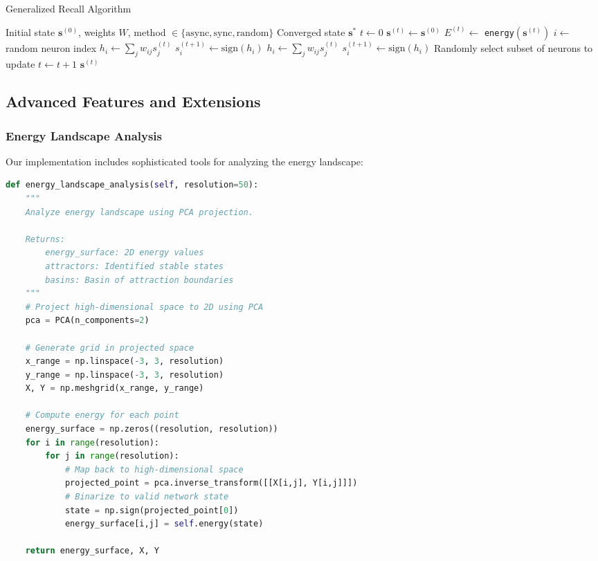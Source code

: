 \documentclass[11pt,a4paper]{article}
\begin{document}
\begin{algorithm}[H]
\caption{Generalized Recall Algorithm}
\begin{algorithmic}[1]
\REQUIRE Initial state $\mathbf{s}^{(0)}$, weights $W$, method $\in \{\text{async}, \text{sync}, \text{random}\}$
\ENSURE Converged state $\mathbf{s}^*$
\STATE $t \leftarrow 0$
\STATE $\mathbf{s}^{(t)} \leftarrow \mathbf{s}^{(0)}$
\REPEAT
    \STATE $E^{(t)} \leftarrow $ \texttt{energy}$(\mathbf{s}^{(t)})$
        \STATE $i \leftarrow $ random neuron index
        \STATE $h_i \leftarrow \sum_{j} w_{ij} s_j^{(t)}$
        \STATE $s_i^{(t+1)} \leftarrow \text{sign}(h_i)$
            \STATE $h_i \leftarrow \sum_{j} w_{ij} s_j^{(t)}$
            \STATE $s_i^{(t+1)} \leftarrow \text{sign}(h_i)$
        \ENDFOR
        \STATE Randomly select subset of neurons to update
    \ENDIF
    \STATE $t \leftarrow t + 1$
\RETURN $\mathbf{s}^{(t)}$
\end{algorithmic}
\end{algorithm}

\subsection{Advanced Features and Extensions}

\subsubsection{Energy Landscape Analysis}

Our implementation includes sophisticated tools for analyzing the energy landscape:

\begin{lstlisting}[language=Python, caption=Energy Landscape Analysis]
def energy_landscape_analysis(self, resolution=50):
    """
    Analyze energy landscape using PCA projection.
    
    Returns:
        energy_surface: 2D energy values
        attractors: Identified stable states
        basins: Basin of attraction boundaries
    """
    # Project high-dimensional space to 2D using PCA
    pca = PCA(n_components=2)
    
    # Generate grid in projected space
    x_range = np.linspace(-3, 3, resolution)
    y_range = np.linspace(-3, 3, resolution)
    X, Y = np.meshgrid(x_range, y_range)
    
    # Compute energy for each point
    energy_surface = np.zeros((resolution, resolution))
    for i in range(resolution):
        for j in range(resolution):
            # Map back to high-dimensional space
            projected_point = pca.inverse_transform([[X[i,j], Y[i,j]]])
            # Binarize to valid network state
            state = np.sign(projected_point[0])
            energy_surface[i,j] = self.energy(state)
    
    return energy_surface, X, Y
\end{lstlisting}
\end{document}
